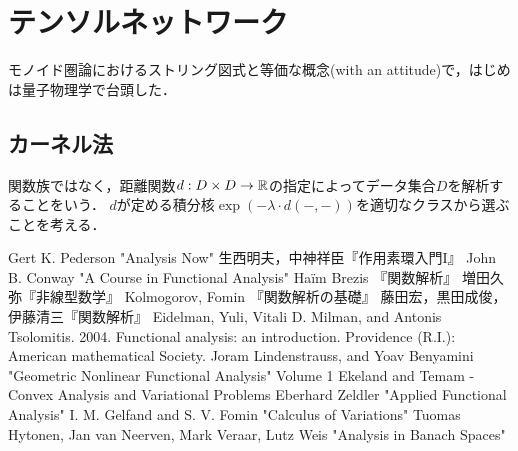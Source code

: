 \documentclass[uplatex,dvipdfmx]{jsreport}
\begin{document}
\section{テンソルネットワーク}

\begin{tcolorbox}[colframe=ForestGreen, colback=ForestGreen!10!white,breakable,colbacktitle=ForestGreen!40!white,coltitle=black,fonttitle=\bfseries\sffamily,
title=]
    モノイド圏論におけるストリング図式と等価な概念(with an attitude)で，はじめは量子物理学で台頭した．
\end{tcolorbox}

\subsection{カーネル法}

\begin{tcolorbox}[colframe=ForestGreen, colback=ForestGreen!10!white,breakable,colbacktitle=ForestGreen!40!white,coltitle=black,fonttitle=\bfseries\sffamily,
title=]
    関数族ではなく，距離関数$d:D\times D\to\mathbb{R}$の指定によってデータ集合$D$を解析することをいう．
    $d$が定める積分核$\exp(-\lambda\cdot d(-,-))$を適切なクラスから選ぶことを考える．
\end{tcolorbox}

\begin{thebibliography}{99}
    Gert K. Pederson "Analysis Now"
    生西明夫，中神祥臣『作用素環入門I』
    John B. Conway "A Course in Functional Analysis"
    Haïm Brezis 『関数解析』
    増田久弥『非線型数学』
    Kolmogorov, Fomin 『関数解析の基礎』
    藤田宏，黒田成俊，伊藤清三『関数解析』
    Eidelman, Yuli, Vitali D. Milman, and Antonis Tsolomitis. 2004. Functional analysis: an introduction. Providence (R.I.): American mathematical Society.
    Joram Lindenstrauss, and Yoav Benyamini "Geometric Nonlinear Functional Analysis" Volume 1
    Ekeland and Temam -  Convex Analysis and Variational Problems
    Eberhard Zeldler "Applied Functional Analysis"
    I. M. Gelfand and S. V. Fomin "Calculus of Variations"
    Tuomas Hytonen, Jan van Neerven, Mark Veraar, Lutz Weis "Analysis in Banach Spaces"
\end{thebibliography}
\end{document}
